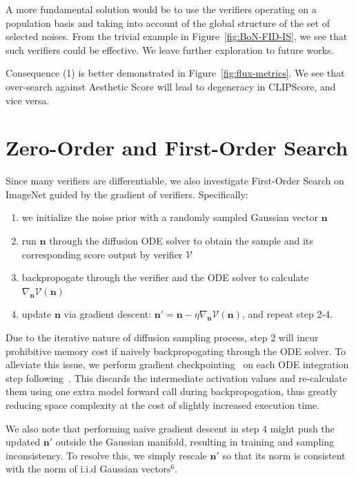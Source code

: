 \documentclass[11pt, letterpaper, logo]{googledeepmind}
\begin{document}
A more fundamental solution would be to use the verifiers operating on a population basis and taking into account of the global structure of the set of selected noises. From the trivial example in Figure~\ref{fig:BoN-FID-IS}, we see that such verifiers could be effective. We leave further exploration to future works.


Consequence (1) is better demonstrated in Figure~\ref{fig:flux-metrics}. We see that over-search against Aesthetic Score will lead to degeneracy in CLIPScore, and vice versa.


\vspace{-0.5cm}
\section{Zero-Order and First-Order Search}
\label{app:sec:first-order}

Since many verifiers are differentiable, we also investigate First-Order Search on ImageNet guided by the gradient of verifiers. Specifically: \begin{enumerate}
    \item we initialize the noise prior with a randomly sampled Gaussian vector $\mathbf{n}$
    \item run $\mathbf{n}$ through the diffusion ODE solver to obtain the sample and its corresponding score output by verifier $\mathcal{V}$
    \item backpropogate through the verifier and the ODE solver to calculate $\nabla_\mathbf{n} \mathcal{V}(\mathbf{n})$
    \item update $\mathbf{n}$ via gradient descent: $\mathbf{n}' = \mathbf{n} - \eta \nabla_\mathbf{n} \mathcal{V}(\mathbf{n})$, and repeat step 2-4.
\end{enumerate}


Due to the iterative nature of diffusion sampling process, step 2 will incur prohibitive memory cost if naively backpropogating through the ODE solver. To alleviate this issue, we perform gradient checkpointing~\citep{chen2016training} on each ODE integration step following~\citep{wallace2023end, ben2024d, novack2024ditto}. This discards the intermediate activation values and re-calculate them using one extra model forward call during backpropogation, thus greatly reducing space complexity at the cost of slightly increased execution time.


We also note that performing naive gradient descent in step 4 might push the updated $\mathbf{n}'$ outside the Gaussian manifold, resulting in training and sampling inconsistency. To resolve this, we simply rescale $\mathbf{n}'$ so that its norm is consistent with the norm of i.i.d Gaussian vectors$^6$.
\end{document}
